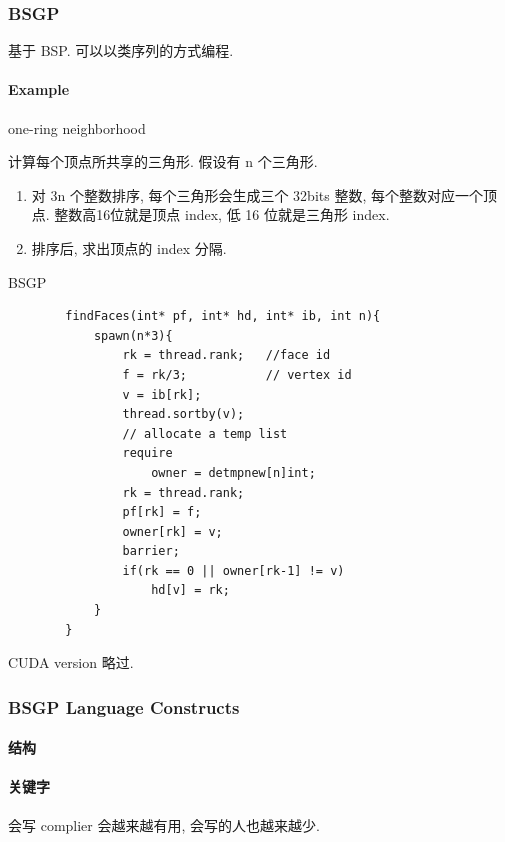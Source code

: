 \subsubsection{BSGP}
基于 BSP. 可以以类序列的方式编程.

\paragraph{Example} one-ring neighborhood

计算每个顶点所共享的三角形. 假设有 n 个三角形. 

\begin{enumerate}
    \item 对 3n 个整数排序, 每个三角形会生成三个 32bits 整数, 每个整数对应一个顶点. 整数高16位就是顶点 index, 低 16 位就是三角形 index. 
    \item 排序后, 求出顶点的 index 分隔. 
\end{enumerate}

\begin{code}
    \caption{BSGP}
    \begin{verbatim}
        findFaces(int* pf, int* hd, int* ib, int n){
            spawn(n*3){
                rk = thread.rank;   //face id
                f = rk/3;           // vertex id
                v = ib[rk];
                thread.sortby(v);
                // allocate a temp list
                require
                    owner = detmpnew[n]int;
                rk = thread.rank;
                pf[rk] = f;
                owner[rk] = v;
                barrier;
                if(rk == 0 || owner[rk-1] != v)
                    hd[v] = rk;
            }
        }
    \end{verbatim}
\end{code}

CUDA version 略过.

\subsubsection{BSGP Language Constructs}
\paragraph{结构}\quad
\paragraph{关键字}\quad

会写 complier 会越来越有用, 会写的人也越来越少. 


